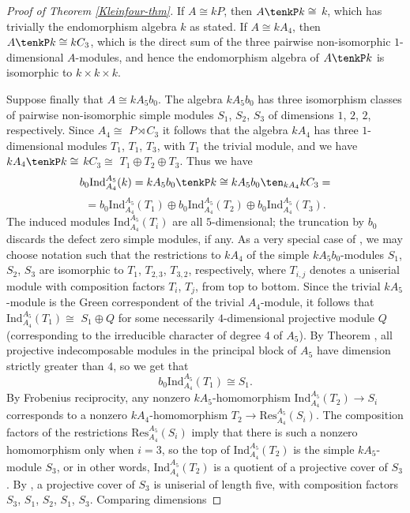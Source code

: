 \documentclass{amsart}
\theoremstyle{plain}\newtheorem{Theorem}{Theorem}[section]
\theoremstyle{plain}\newtheorem{Conjecture}[Theorem]{Conjecture}
\theoremstyle{plain}\newtheorem{Corollary}[Theorem]{Corollary}
\theoremstyle{plain}\newtheorem{Lemma}[Theorem]{Lemma}
\theoremstyle{plain}\newtheorem{Proposition}[Theorem]{Proposition}
\theoremstyle{definition}\newtheorem{Definition}[Theorem]{Definition}
\theoremstyle{definition}\newtheorem{Example}[Theorem]{Example}
\theoremstyle{definition}\newtheorem{Examples}[Theorem]{Examples}
\theoremstyle{definition}\newtheorem{Exercise}[Theorem]{Exercise}
\theoremstyle{definition}\newtheorem{Notation}[Theorem]{Notation}
\theoremstyle{definition}\newtheorem{Remark}[Theorem]{Remark}
\theoremstyle{definition}\newtheorem{Remarks}[Theorem]{Remarks}
\theoremstyle{plain}\newtheorem{Statement}[Theorem]{}
\def\Ind{\mathrm{Ind}}    \def\tenC{\otimes_C}
\def\Res{\mathrm{Res}}           \def\tenOR{\otimes_{\mathcal{O}R}}
\begin{document}
\begin{proof}[Proof of Theorem \ref{Kleinfour-thm}]
If $A\cong kP$, then $A\tenkP k\cong$ $k$, which has trivially the endomorphism 
algebra $k$ as stated.
If $A\cong kA_4$, then $A\tenkP k\cong kC_3$, which is the direct sum of the
three pairwise non-isomorphic $1$-dimensional $A$-modules, and hence
the endomorphism algebra of $A\tenkP k$ is isomorphic to $k\times k\times k$.

\medskip
Suppose finally that  $A\cong kA_5b_0$. The algebra $kA_5b_0$ has three isomorphism 
classes of pairwise 
non-isomorphic simple modules $S_1$, $S_2$, $S_3$ of dimensions $1$, $2$, $2$,
respectively. Since $A_4\cong$ $P\rtimes C_3$ it follows
that the algebra $kA_4$ has three $1$-dimensional
modules $T_1$, $T_1$, $T_3$, with $T_1$ the trivial module, and we have
$kA_4\tenkP k \cong$ $kC_3\cong$ $T_1\oplus T_2\oplus T_3$.
Thus we have
$$b_0\Ind_{A_4}^{A_5}(k)= kA_5b_0\tenkP k \cong 
kA_5b_0 \ten_{kA_4} kC_3 = $$
$$=b_0\Ind^{A_5}_{A_4}(T_1) \oplus
b_0\Ind^{A_5}_{A_4}(T_2) \oplus b_0\Ind^{A_5}_{A_4}(T_3).$$
The induced modules $\Ind^{A_5}_{A_4}(T_i)$ are all $5$-dimensional; the truncation
by $b_0$ discards the defect zero simple modules, if any. 
As a very special case
of \cite[Theorem 3]{Erdmann82}, we may choose notation such that
 the restrictions to $kA_4$ of the simple
$kA_5b_0$-modules $S_1$, $S_2$, $S_3$ are isomorphic to $T_1$, $T_{2,3}$, $T_{3,2}$,
respectively, where $T_{i,j}$ denotes a uniserial module with composition factors
$T_i$, $T_j$, from top to bottom. Since the trivial $kA_5$-module is the Green
correspondent of the trivial $A_4$-module, it follows that
$\Ind^{A_5}_{A_4}(T_1)\cong$ $S_1\oplus Q$ for some necessarily $4$-dimensional
projective module $Q$ (corresponding to the irreducible character of degree $4$
of $A_5$). By Theorem \cite[Theorem 4]{Erdmann82}, all
projective indecomposable modules in the principal block of $A_5$ have dimension
strictly greater than $4$, so we get that 
$$b_0\Ind^{A_5}_{A_4}(T_1)\cong  S_1.$$
By Frobenius reciprocity, any nonzero $kA_5$-homomorphism 
$\Ind^{A_5}_{A_4}(T_2)\to S_i$ corresponds to a nonzero $kA_4$-homomorphism
$T_2\to \Res^{A_5}_{A_4}(S_i)$. The composition factors of the restrictions 
$\Res^{A_5}_{A_4}(S_i)$ imply that there is such a nonzero homomorphism only
when $i=3$, so the top of $\Ind^{A_5}_{A_4}(T_2)$ is the simple $kA_5$-module
$S_3$, or in other words, $\Ind^{A_5}_{A_4}(T_2)$ is a quotient of a projective
cover  of $S_3$. By \cite[Theorem 4]{Erdmann82}, a projective cover of
$S_3$  is uniserial of length five, 
with composition factors $S_3$, $S_1$, $S_2$, $S_1$, $S_3$. Comparing dimensions

\end{proof}
\end{document}
